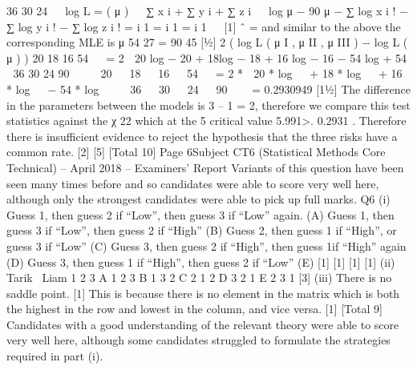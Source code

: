 36
30
24


log L =
( μ )   ∑ x i + ∑ y i + ∑ z i   log μ − 90 μ − ∑ log x i ! − ∑ log y i ! − ∑ log z i !
= i 1 = i 1 = i 1


[1]
ˆ
=
and similar to the above the corresponding MLE is μ
54 27
=
90 45
[1⁄2]
2 ( log L ( μ I , μ II , μ III ) − log L ( μ ) )
20
18
16
54


= 2  20 log − 20 + 18log − 18 + 16 log − 16 − 54 log + 54 
36
30
24
90



 20 
 18 
 16 
 54  
= 2 *  20 * log   + 18 * log   + 16 * log   − 54 * log   
 36 
 30 
 24 
 90  

= 0.2930949
[11⁄2]
The difference in the parameters between the models is 3 – 1 = 2, therefore we
compare this test statistics against the χ 22 which at the 5%
critical value 5.991>. 0.2931 . Therefore there is insufficient evidence to reject
the hypothesis that the three risks have a common rate.
[2]
[5]
[Total 10]
Page 6Subject CT6 (Statistical Methods Core Technical) – April 2018 – Examiners’ Report
Variants of this question have been seen many times before and so
candidates were able to score very well here, although only the
strongest candidates were able to pick up full marks.
Q6
(i)
Guess 1, then guess 2 if “Low”, then guess 3 if “Low” again. (A)
Guess 1, then guess 3 if “Low”, then guess 2 if “High” (B)
Guess 2, then guess 1 if “High”, or guess 3 if “Low” (C)
Guess 3, then guess 2 if “High”, then guess 1if “High” again (D)
Guess 3, then guess 1 if “High”, then guess 2 if “Low” (E)
[1]
[1]
[1]
[1]
(ii)
Tarik \ Liam
1
2
3
A
1
2
3
B
1
3
2
C
2
1
2
D
3
2
1
E
2
3
1
[3]
(iii)
There is no saddle point.
[1]
This is because there is no element in the matrix which is both the highest in
the row and lowest in the column, and vice versa.
[1]
[Total 9]
Candidates with a good understanding of the relevant theory were able
to score very well here, although some candidates struggled to
formulate the strategies required in part (i).
